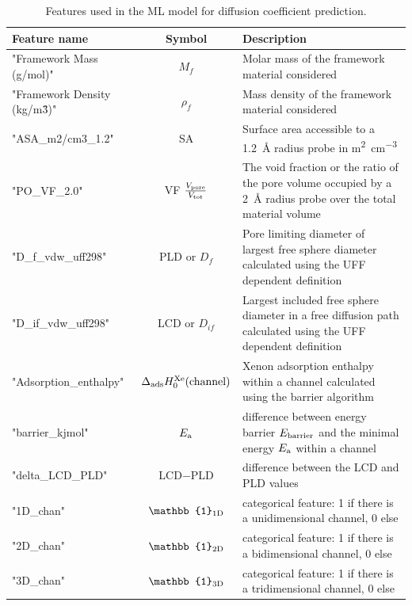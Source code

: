 \documentclass[main]{subfiles}
\begin{document}
\begin{table}[ht]
  \setlength{\extrarowheight}{1pt}
  \centering
  \begin{tabular}{|l|c|m{8cm}|}
  \hline
    Feature name  &  Symbol   &   Description\\
  \hline
      "Framework Mass (g/mol)" &   $M_f$ &   Molar mass of the framework material considered  \\
      "Framework Density (kg/m\^3)" &   $\rho_f$ &   Mass density of the framework material considered  \\
      "ASA\_m2/cm3\_1.2" &   SA &   Surface area accessible to a \SI{1.2}{\angstrom} radius probe in \si{\square\m\per\cubic\cm}  \\
      "PO\_VF\_2.0" &  VF $\tfrac{V_{\text{pore}}}{V_{\text{tot}}}$ &  The void fraction or the ratio of the pore volume occupied by a \SI{2}{\angstrom} radius probe over the total material volume  \\
      "D\_f\_vdw\_uff298" &   PLD or $D_f$  &   Pore limiting diameter of largest free sphere diameter calculated using the UFF dependent definition  \\
      "D\_if\_vdw\_uff298" &   LCD or $D_{if}$ &   Largest included free sphere diameter in a free diffusion path calculated using the UFF dependent definition  \\
      "Adsorption\_enthalpy" &   $\Delta_{\text{ads}}H_0^{\text{Xe}}(\text{channel})$  &   Xenon adsorption enthalpy within a channel calculated using the barrier algorithm  \\
      "barrier\_kjmol" &   $E_{\text{a}}$  &   difference between energy barrier $E_{\text{barrier}}$ and the minimal energy $E_{\text{a}}$ within a channel \\
      "delta\_LCD\_PLD" &   LCD$-$PLD  &   difference between the LCD and PLD values \\
      "1D\_chan" &  $\mathbb{1}\e{1D}$   &   categorical feature: 1 if there is a unidimensional channel, 0 else \\
      "2D\_chan" &  $\mathbb{1}\e{2D}$   &   categorical feature: 1 if there is a bidimensional channel, 0 else \\
      "3D\_chan" &  $\mathbb{1}\e{3D}$   &   categorical feature: 1 if there is a tridimensional channel, 0 else \\
    \hline
  \end{tabular}
  \caption{ Features used in the ML model for diffusion coefficient prediction. }\label{Table:feat_diff}
\end{table}
\end{document}
